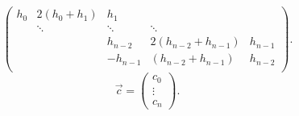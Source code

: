 \documentclass{report}
\begin{document}
\begin{solution}
\begin{enumerate}[label=(\alph*)]
\[\begin{pmatrix}
				      h_0  & 2(h_0+h_1) & h_1      &                     &         \\
				           & \ddots     & \ddots   & \ddots              &         \\
				           &            & h_{n-2}  & 2(h_{n-2} +h_{n-1}) & h_{n-1} \\
				           &            & -h_{n-1} & (h_{n-2} +h_{n-1})  & h_{n-2} \\
			      \end{pmatrix}
			      .\]
		      \[
			      \vec{{c}} =  \begin{pmatrix} c_0\\ \vdots\\ c_n \end{pmatrix}
			      .\]
	\end{enumerate}
\end{solution}
\end{document}
